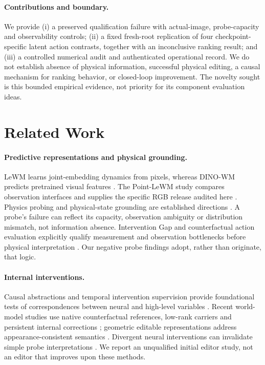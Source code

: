 \paragraph{Contributions and boundary.}
We provide (i) a preserved qualification failure with actual-image, probe-capacity
and observability controls; (ii) a fixed fresh-root replication of four
checkpoint-specific latent action contrasts, together with an inconclusive
ranking result; and (iii) a controlled numerical audit and authenticated
operational record. We do not establish absence of physical information,
successful physical editing, a causal mechanism for ranking behavior, or
closed-loop improvement. The novelty sought is this bounded empirical evidence,
not priority for its component evaluation ideas.

\section{Related Work}
\label{sec:related}

\paragraph{Predictive representations and physical grounding.}
LeWM learns joint-embedding dynamics from pixels, whereas DINO-WM predicts
pretrained visual features \citep{maes2026lewm,zhou2025dinowm,oquab2023dinov2}.
The Point-LeWM study compares observation interfaces and supplies the specific
RGB release audited here \citep{oberweger2026pointlewm}. Physics probing and
physical-state grounding are established directions
\citep{joseph2026interpretingphysics,yan2026psgjepa}. A probe's failure can
reflect its capacity, observation ambiguity or distribution mismatch, not
information absence. Intervention Gap and counterfactual action evaluation
explicitly qualify measurement and observation bottlenecks before physical
interpretation \citep{vakalis2026interventiongap,subramanian2026counterfactual}.
Our negative probe findings adopt, rather than originate, that logic.

\paragraph{Internal interventions.}
Causal abstractions and temporal intervention supervision provide foundational
tests of correspondences between neural and high-level variables
\citep{geiger2021causalabstractions,lippe2022citris}. Recent world-model studies
use native counterfactual references, low-rank carriers and persistent internal
corrections \citep{liu2026latentcarriers,yao2026rolloutfaith}; geometric editable
representations address appearance-consistent semantics
\citep{huang2026geocosavi}. Divergent neural interventions can invalidate simple
probe interpretations \citep{grant2025divergent}. We report an unqualified
initial editor study, not an editor that improves upon these methods.

